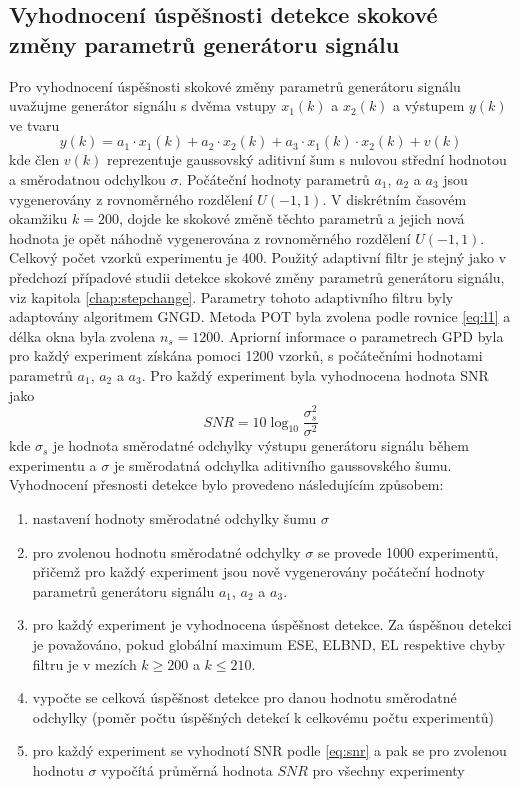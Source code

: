 \subsection{Vyhodnocení úspěšnosti detekce skokové změny parametrů generátoru signálu}
Pro vyhodnocení úspěšnosti skokové změny parametrů generátoru signálu uvažujme generátor signálu s dvěma vstupy $x_1(k)$ a $x_2(k)$ a výstupem $y(k)$ ve tvaru
\begin{equation}
y(k)=a_1\cdot x_1(k)+a_2\cdot x_2(k)+a_3\cdot x_1(k) \cdot x_2(k)+v(k)
\end{equation}
kde člen $v(k)$ reprezentuje gaussovský aditivní šum s nulovou střední hodnotou a směrodatnou odchylkou $\sigma$. Počáteční hodnoty parametrů $a_1$, $a_2$ a $a_3$ jsou vygenerovány z rovnoměrného rozdělení $U(-1,1)$. V diskrétním časovém okamžiku $k=200$, dojde ke skokové změně těchto parametrů a jejich nová hodnota je opět náhodně vygenerována z rovnoměrného rozdělení $U(-1,1)$. Celkový počet vzorků experimentu je 400.
Použitý adaptivní filtr je stejný jako v předchozí případové studii detekce skokové změny parametrů generátoru signálu, viz kapitola \ref{chap:stepchange}. Parametry tohoto adaptivního filtru byly adaptovány algoritmem GNGD. Metoda POT byla zvolena podle rovnice \ref{eq:l1} a délka okna byla zvolena $n_s=1200$. Apriorní informace o parametrech GPD byla pro každý experiment získána pomoci 1200 vzorků, s počátečními hodnotami parametrů $a_1$, $a_2$ a $a_3$. Pro každý experiment byla vyhodnocena hodnota SNR jako
\begin{equation}\label{eq:snr}
SNR=10\log_{10}\frac{\sigma_s^2}{\sigma^2}
\end{equation}
kde $\sigma_s$  je hodnota směrodatné odchylky výstupu generátoru signálu během experimentu a $\sigma$ je směrodatná odchylka aditivního gaussovského šumu. Vyhodnocení přesnosti detekce bylo provedeno následujícím způsobem:
\begin{enumerate}
\item nastavení hodnoty směrodatné odchylky šumu $\sigma$
\item pro zvolenou hodnotu směrodatné odchylky $\sigma$ se provede 1000 experimentů, přičemž pro každý experiment jsou nově vygenerovány počáteční hodnoty parametrů generátoru signálu $a_1$, $a_2$ a $a_3$.
\item pro každý experiment je vyhodnocena úspěšnost detekce. Za úspěšnou detekci je považováno, pokud globální maximum ESE, ELBND, EL respektive chyby filtru je v mezích $k\geq 200$ a $k\leq 210$. 
\item vypočte se celková úspěšnost detekce pro danou hodnotu směrodatné odchylky (poměr počtu úspěšných detekcí k celkovému počtu experimentů)
\item pro každý experiment se vyhodnotí SNR podle \ref{eq:snr} a pak se pro zvolenou hodnotu $\sigma$ vypočítá průměrná hodnota $SNR$ pro všechny experimenty
\end{enumerate}
